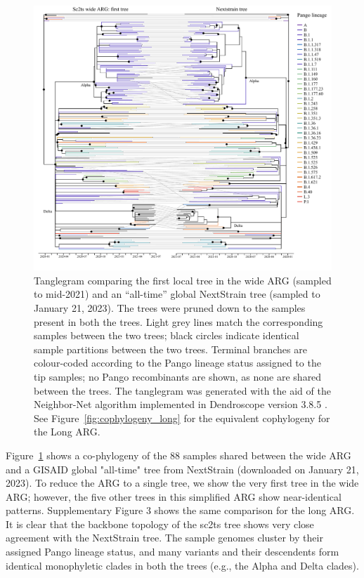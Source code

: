 \documentclass{article}
\begin{document}
\begin{figure} \centering
\includegraphics[width=\textwidth]{figures/cophylogeny_wide.pdf}
\caption{\label{fig:cophylogeny} Tanglegram comparing the first local tree in the
wide ARG (sampled to mid-2021) and an “all-time” global NextStrain tree (sampled
to January 21, 2023). The trees were pruned down to the samples present in both
the trees. Light grey lines match the corresponding samples between the two
trees; black circles indicate identical sample partitions between the two trees.
Terminal branches are colour-coded according to the Pango lineage status
assigned to the tip samples; no Pango recombinants are shown, as none are shared
between the trees. The tanglegram was generated with the aid of the Neighbor-Net
algorithm \citep{Scornavacca2011-mg} implemented in Dendroscope
version 3.8.5 \citep{Huson2012-ys}. See
Figure~\ref{fig:cophylogeny_long} for the equivalent cophylogeny
for the Long ARG.}
\end{figure}


Figure~\ref{fig:cophylogeny} shows a co-phylogeny of the 88 samples shared between the wide ARG and
a GISAID global "all-time" tree from NextStrain (downloaded on January 21,
2023). To reduce the ARG to a single tree, we show the very first tree in the
wide ARG; however, the five other trees in this simplified ARG show
near-identical patterns. Supplementary Figure 3 shows the same comparison for
the long ARG. It is clear that the backbone topology of the sc2ts tree shows
very close agreement with the NextStrain tree. The sample genomes cluster by
their assigned Pango lineage status, and many variants and their descendents
form identical monophyletic clades in both the trees (e.g., the Alpha and Delta
clades).
\end{document}
